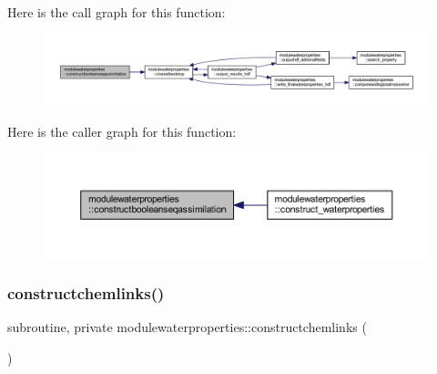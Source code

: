 Here is the call graph for this function\+:\nopagebreak
\begin{figure}[H]
\begin{center}
\leavevmode
\includegraphics[width=350pt]{namespacemodulewaterproperties_aa5d8008c930a03a6746ab2ae44f44f14_cgraph}
\end{center}
\end{figure}
Here is the caller graph for this function\+:\nopagebreak
\begin{figure}[H]
\begin{center}
\leavevmode
\includegraphics[width=350pt]{namespacemodulewaterproperties_aa5d8008c930a03a6746ab2ae44f44f14_icgraph}
\end{center}
\end{figure}
\mbox{\label{namespacemodulewaterproperties_aac68ff898a933da27b109068c70a5f15}} 
\subsubsection{\texorpdfstring{constructchemlinks()}{constructchemlinks()}}
{\footnotesize\ttfamily subroutine, private modulewaterproperties\+::constructchemlinks (\begin{DoxyParamCaption}{ }\end{DoxyParamCaption})\hspace{0.3cm}{\ttfamily [private]}}

